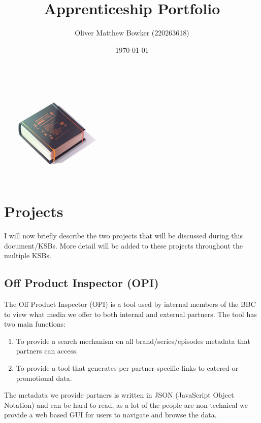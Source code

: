 \documentclass{article}
\title{Apprenticeship Portfolio}
\author{Oliver Matthew Bowker (220263618)}
\date{\today}
\begin{document}
  \maketitle
  \begin{center}
    \includegraphics[width=5cm]{assets/cover.png}
  \end{center}
  \newpage

  \tableofcontents
  \newpage

  \listoffigures
  \newpage

  \listoftables
  \newpage

  \listoftodos
  \newpage

  \section{Projects}
  I will now briefly describe the two projects that will be discussed during this document/KSBs. More detail will be added to these projects throughout the
  multiple KSBs.
  
  \subsection{Off Product Inspector (OPI)}
  The Off Product Inspector (OPI) is a tool used by internal members of the BBC to view what media we offer to both internal and external partners. The tool 
  has two main functions:


  \begin{enumerate}
    \item To provide a search mechanism on all brand/series/episodes metadata that partners can access.
    \item To provide a tool that generates per partner specific links to catered or promotional data.
  \end{enumerate}

  The metadata we provide partners is written in JSON (JavaScript Object Notation) and can be hard to read, as a lot of the people are non-technical we provide
  a web based GUI for users to navigate and browse the data.
\end{document}
